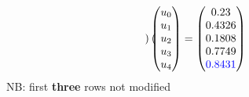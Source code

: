 \documentclass{beamer}
\begin{document}
\begin{frame}[fragile]
$${\begin{aligned}
\begin{pmatrix}
\end{pmatrix}
\begin{pmatrix}
u_0 \\ u_1 \\ u_2 \\ u_3 \\ u_4
\end{pmatrix}
&=
\begin{pmatrix}
0.23\\
0.4326\\
0.1808\\
\textcolor{black}{0.7749}\\
\textcolor{blue}{0.8431}
\end{pmatrix}
\end{aligned}}
$$
NB: first \textbf{three} rows not modified
\end{frame}

\end{document}
